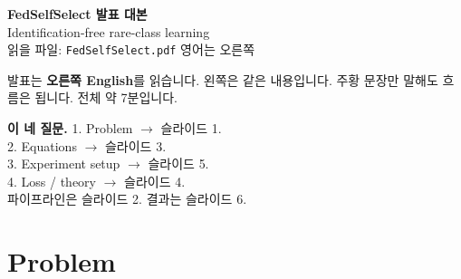 \documentclass[11pt,a4paper]{article}
\begin{document}
\begin{center}
{\LARGE\bfseries\color{navy}FedSelfSelect 발표 대본}\\[0.3em]
{\large\color{teal}Identification-free rare-class learning}\\[0.35em]
{\footnotesize\color{muted}읽을 파일: \texttt{FedSelfSelect.pdf} \quad 영어는 오른쪽}
\end{center}

\vspace{0.2em}
\noindent
발표는 \textbf{오른쪽 English}를 읽습니다. 왼쪽은 같은 내용입니다.
주황 문장만 말해도 흐름은 됩니다. 전체 약 7분입니다.

\begin{tcolorbox}[colback=sand,colframe=teal,boxrule=0.5pt,arc=1pt,
  left=7pt,right=7pt,top=5pt,bottom=5pt]
{\color{navy}\textbf{이 네 질문.}}
1. Problem $\rightarrow$ 슬라이드 1.\\
2. Equations $\rightarrow$ 슬라이드 3.\\
3. Experiment setup $\rightarrow$ 슬라이드 5.\\
4. Loss / theory $\rightarrow$ 슬라이드 4.\\
파이프라인은 슬라이드 2. 결과는 슬라이드 6.
\end{tcolorbox}

\section{Problem}
\end{document}
